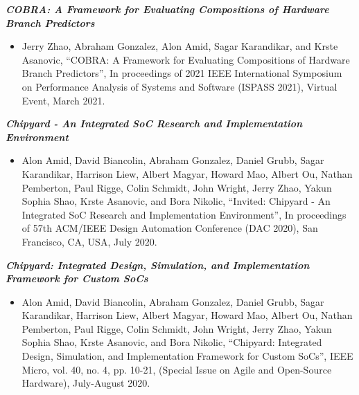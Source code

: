 \documentclass[letter]{res}
\begin{document}
\begin{resume}
\vspace{-2mm}

{\sl \textbf{COBRA: A Framework for Evaluating Compositions of Hardware Branch Predictors}}\\

 \vspace{-4mm}

\begin{itemize}
 \item Jerry Zhao, Abraham Gonzalez, Alon Amid, Sagar Karandikar, and Krste Asanovic, ``COBRA: A Framework for Evaluating Compositions of Hardware Branch Predictors'', In proceedings of 2021 IEEE International Symposium on Performance Analysis of Systems and Software (ISPASS 2021), Virtual Event, March 2021.
\end{itemize}

\vspace{-2mm}

{\sl \textbf{Chipyard - An Integrated SoC Research and Implementation Environment}}\\

 \vspace{-4mm}

\begin{itemize}
 \item Alon Amid, David Biancolin, Abraham Gonzalez, Daniel Grubb, Sagar Karandikar, Harrison Liew, Albert Magyar, Howard Mao, Albert Ou, Nathan Pemberton, Paul Rigge, Colin Schmidt, John Wright, Jerry Zhao, Yakun Sophia Shao, Krste Asanovic, and Bora Nikolic, ``Invited: Chipyard - An Integrated SoC Research and Implementation Environment'', In proceedings of 57th ACM/IEEE Design Automation Conference (DAC 2020), San Francisco, CA, USA, July 2020.
\end{itemize}

\vspace{-2mm}

{\sl \textbf{Chipyard: Integrated Design, Simulation, and Implementation Framework for Custom SoCs}}\\

 \vspace{-4mm}

\begin{itemize}
 \item Alon Amid, David Biancolin, Abraham Gonzalez, Daniel Grubb, Sagar Karandikar, Harrison Liew, Albert Magyar, Howard Mao, Albert Ou, Nathan Pemberton, Paul Rigge, Colin Schmidt, John Wright, Jerry Zhao, Yakun Sophia Shao, Krste Asanovic, and Bora Nikolic, ``Chipyard: Integrated Design, Simulation, and Implementation Framework for Custom SoCs'', IEEE Micro, vol. 40, no. 4, pp. 10-21, (Special Issue on Agile and Open-Source Hardware), July-August 2020.
\end{itemize}


\end{resume}
\end{document}
